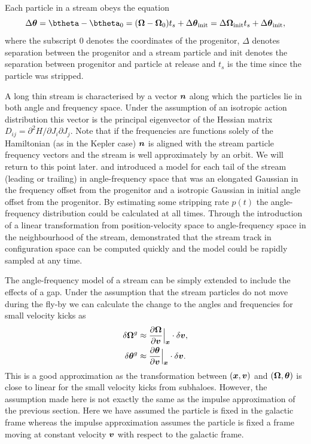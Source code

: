 \documentclass[useAMS,usenatbib,fleqn,a4paper]{mn2e}
\newcommand{\bs}[1]{\bmath{#1}}
\begin{document}
Each particle in a stream obeys the equation
\begin{equation}
\Delta\bs{\theta} = \btheta-\btheta_0 = (\boldsymbol{\Omega}-\boldsymbol{\Omega}_0)t_s +\Delta\bs{\theta}_\mathrm{init}= \Delta\bs{\Omega}_\mathrm{init}t_s+\Delta\bs{\theta}_\mathrm{init},
\end{equation}
where the subscript $0$ denotes the coordinates of the progenitor, $\Delta$ denotes separation between the progenitor and a stream particle and $\mathrm{init}$ denotes the separation between progenitor and particle at release and $t_s$ is the time since the particle was stripped.

A long thin stream is characterised by a vector $\bs{n}$ along which the particles lie in both angle and frequency space. Under the assumption of an isotropic action distribution this vector is the principal eigenvector of the Hessian matrix $D_{ij}=\partial^2 H/\partial J_i\partial J_j$. Note that if the frequencies are functions solely of the Hamiltonian (as in the Kepler case) $\bs{n}$ is aligned with the stream particle frequency vectors and the stream is well approximately by an orbit. We will return to this point later. \cite{Bovy2014} and \cite{Sanders2014} introduced a model for each tail of the stream (leading or trailing) in angle-frequency space that was an elongated Gaussian in the frequency offset from the progenitor and a isotropic Gaussian in initial angle offset from the progenitor. By estimating some stripping rate $p(t)$ the angle-frequency distribution could be calculated at all times. Through the introduction of a linear transformation from position-velocity space to angle-frequency space in the neighbourhood of the stream, \cite{Bovy2014} demonstrated that the stream track in configuration space can be computed quickly and the model could be rapidly sampled at any time.

The angle-frequency model of a stream can be simply extended to include the effects of a gap. Under the assumption that the stream particles do not move during the fly-by we can calculate the change to the angles and frequencies for small velocity kicks as
\begin{equation}
\begin{split}
\delta \boldsymbol{\Omega}^g &\approx \frac{\upartial \boldsymbol{\Omega}}{\upartial \bs{v}}\Big|_{\bs{x}}\cdot \delta\bs{v},\\
\delta \bs{\theta}^g &\approx \frac{\upartial \bs{\theta}}{\upartial \bs{v}}\Big|_{\bs{x}}\cdot \delta\bs{v}.
\end{split}
\end{equation}
This is a good approximation as the transformation between $(\bs{x},\bs{v})$ and $(\boldsymbol{\Omega},\bs{\theta})$ is close to linear for the small velocity kicks from subhaloes. However, the assumption made here is not exactly the same as the impulse approximation of the previous section. Here we have assumed the particle is fixed in the galactic frame whereas the impulse approximation assumes the particle is fixed a frame moving at constant velocity $\bs{v}$ with respect to the galactic frame.
\end{document}
